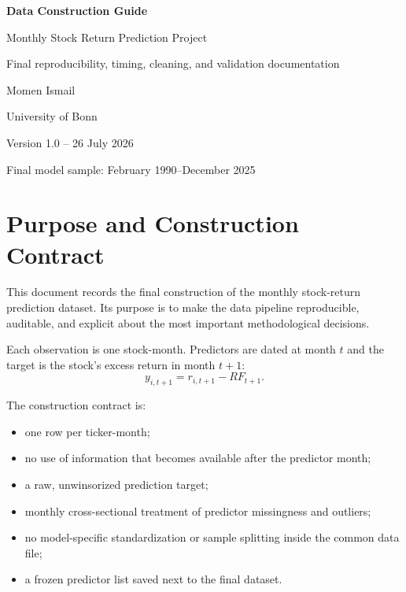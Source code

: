 \documentclass[11pt,a4paper]{article}
\begin{document}
\hypersetup{pageanchor=false}

\begin{titlepage}
\centering
\vspace*{2.7cm}
{\Huge\bfseries\color{navy} Data Construction Guide\par}
\vspace{0.45cm}
{\Large Monthly Stock Return Prediction Project\par}
\vspace{1.0cm}
{\large Final reproducibility, timing, cleaning, and validation documentation\par}
\vfill
{\large Momen Ismail\par}
\vspace{0.15cm}
{\large University of Bonn\par}
\vfill
{\small Version 1.0 -- 26 July 2026\par}
\vspace{0.1cm}
{\small Final model sample: February 1990--December 2025}
\end{titlepage}

\tableofcontents
\newpage
{}
\hypersetup{pageanchor=true}

\section{Purpose and Construction Contract}

This document records the final construction of the monthly stock-return prediction dataset. Its purpose is to make the data pipeline reproducible, auditable, and explicit about the most important methodological decisions.

Each observation is one stock-month. Predictors are dated at month $t$ and the target is the stock's excess return in month $t+1$:
\[
  y_{i,t+1}=r_{i,t+1}-RF_{t+1}.
\]

The construction contract is:
\begin{itemize}
  \item one row per ticker-month;
  \item no use of information that becomes available after the predictor month;
  \item a raw, unwinsorized prediction target;
  \item monthly cross-sectional treatment of predictor missingness and outliers;
  \item no model-specific standardization or sample splitting inside the common data file;
  \item a frozen predictor list saved next to the final dataset.
\end{itemize}
\end{document}

